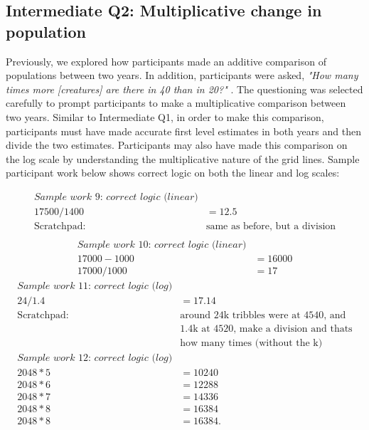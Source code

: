 \documentclass[print]{nuthesis}
\begin{document}
\hypertarget{intermediate-q2-multiplicative-change-in-population}{%
\subsection{Intermediate Q2: Multiplicative change in population}\label{intermediate-q2-multiplicative-change-in-population}}

Previously, we explored how participants made an additive comparison of populations between two years.
In addition, participants were asked, \textit{"How many times more [creatures] are there in 40 than in 20?"} .
The questioning was selected carefully to prompt participants to make a multiplicative comparison between two years.
Similar to Intermediate Q1, in order to make this comparison, participants must have made accurate first level estimates in both years and then divide the two estimates.
Participants may also have made this comparison on the log scale by understanding the multiplicative nature of the grid lines. Sample participant work below shows correct logic on both the linear and log scales:

\begin{align}
\textit{Sample work 9: correct logic (linear)} \nonumber\\
17500/1400&=12.5 \nonumber\\    
\text{Scratchpad: } & \text{same as before, but a division} \nonumber\\
\end{align}
\begin{align}
\textit{Sample work 10: correct logic (linear)} \nonumber\\
17000-1000&=16000 \nonumber\\
17000/1000&=17  \nonumber
\end{align}
\begin{align}
\textit{Sample work 11: correct logic (log)} \nonumber\\
24/1.4&=17.14    \nonumber\\ 
\text{Scratchpad: } & \text{around 24k tribbles were at 4540, and} \nonumber\\
                   & \text{1.4k at 4520, make a division and thats}\nonumber\\
                   & \text{how many times (without the k)}\nonumber
\nonumber \\
\textit{Sample work 12: correct logic (log)} \nonumber\\                   
2048*5&=10240 \nonumber\\   
2048*6&=12288 \nonumber\\   
2048*7&=14336 \nonumber\\   
2048*8&=16384  \nonumber\\   
2048*8&=16384. \nonumber
\end{align}
\end{document}

